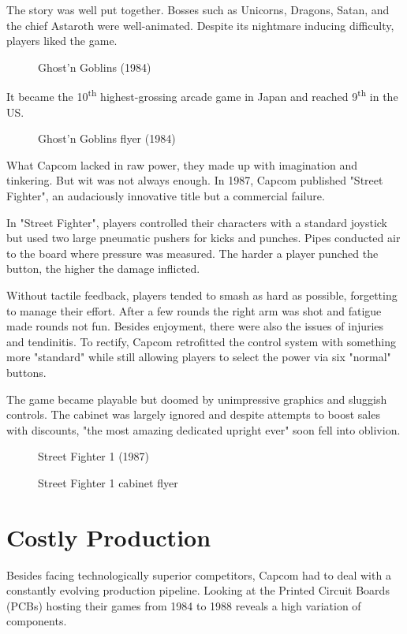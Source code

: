 The story was well put together. Bosses such as Unicorns, Dragons, Satan, and the chief Astaroth were well-animated. Despite its nightmare inducing difficulty, players liked the game. 

\vfill 

\begin{figure}[H]
\caption*{Ghost’n Goblins (1984)}
\end{figure}
\pagebreak

It became the 10\textsuperscript{th} highest-grossing arcade game in Japan and reached 9\textsuperscript{th} in the US.
\vfill 
\begin{figure}[H]
\caption*{Ghost’n Goblins flyer (1984)}
\end{figure}
\pagebreak

What Capcom lacked in raw power, they made up with imagination and tinkering. But wit was not always enough. In 1987, Capcom published "Street Fighter", an audaciously innovative title but a commercial failure.

In "Street Fighter", players controlled their characters with a standard joystick but used two large pneumatic pushers for kicks and punches. Pipes conducted air to the board where pressure was measured. The harder a player punched the button, the higher the damage inflicted.

Without tactile feedback, players tended to smash as hard as possible, forgetting to manage their effort. After a few rounds the right arm was shot and fatigue made rounds not fun. Besides enjoyment, there were also the issues of injuries and tendinitis. To rectify, Capcom retrofitted the control system with something more "standard" while still allowing players to select the power via six "normal" buttons. 

The game became playable but doomed by unimpressive graphics and sluggish controls. The cabinet was largely ignored and despite attempts to boost sales with discounts, "the most amazing dedicated upright ever" soon fell into oblivion.


\begin{figure}[H]
\caption*{Street Fighter 1 (1987)}
\end{figure}


\begin{figure}[H]
\caption*{Street Fighter 1 cabinet flyer}
\end{figure}


\section{Costly Production}
Besides facing technologically superior competitors, Capcom had to deal with a constantly evolving production pipeline. Looking at the Printed Circuit Boards (PCBs) hosting their games from 1984 to 1988 reveals a high variation of components.

